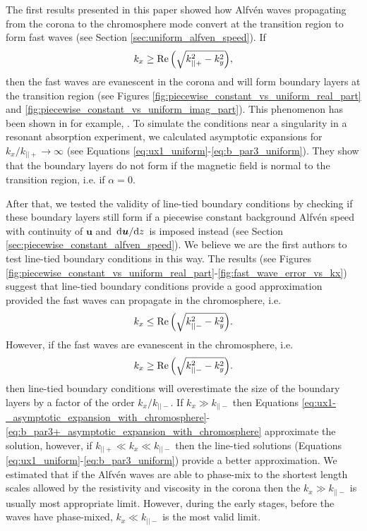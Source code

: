 \documentclass[linenumbers]{aastex63}
\let\vec\boldsymbol
\begin{document}
The first results presented in this paper showed how Alfv\'en waves propagating from the corona to the chromosphere mode convert at the transition region to form fast waves (see Section \ref{sec:uniform_alfven_speed}). If
\[k_x \ge \Re\qty(\sqrt{k_{||+}^2 - k_y^2}),\]
then the fast waves are evanescent in the corona and will form boundary layers at the transition region (see Figures \ref{fig:piecewise_constant_vs_uniform_real_part} and \ref{fig:piecewise_constant_vs_uniform_imag_part}). This phenomenon has been shown in for example, \citet{Halberstadt1993,Halberstadt1995,Arregui2003}. 
To simulate the conditions near a singularity in a resonant absorption experiment, we calculated asymptotic expansions for $k_x / k_{||+} \rightarrow \infty$ (see Equations \ref{eq:ux1_uniform}-\ref{eq:b_par3_uniform}). They show that the boundary layers do not form if the magnetic field is normal to the transition region, i.e. if $\alpha=0$.

After that, we tested the validity of line-tied boundary conditions by checking if these boundary layers still form if a piecewise constant background Alfv\'en speed with continuity of $\vec{u}$ and $\dv*{\vec{u}}{z}$ is imposed instead (see Section \ref{sec:piecewise_constant_alfven_speed}). We believe we are the first authors to test line-tied boundary conditions in this way. The results (see Figures \ref{fig:piecewise_constant_vs_uniform_real_part}-\ref{fig:fast_wave_error_vs_kx}) suggest that line-tied boundary conditions provide a good approximation provided the fast waves can propagate in the chromosphere, i.e.
\[k_x \le \Re\qty(\sqrt{k_{||-}^2 - k_y^2}).\]
However, if the fast waves are evanescent in the chromosphere, i.e. 
\[k_x \ge \Re\qty(\sqrt{k_{||-}^2 - k_y^2}).\]
then line-tied boundary conditions will overestimate the size of the boundary layers by a factor of the order $k_x / k_{||-}$. If $k_x\gg k_{||-}$ then Equations \eqref{eq:ux1-_asymptotic_expansion_with_chromosphere}-\eqref{eq:b_par3+_asymptotic_expansion_with_chromosphere} approximate the solution, however, if $k_{||+} \ll k_x\ll k_{||-}$ then the line-tied solutions (Equations \ref{eq:ux1_uniform}-\ref{eq:b_par3_uniform}) provide a better approximation. We estimated that if the Alfv\'en waves are able to phase-mix to the shortest length scales allowed by the resistivity and viscosity in the corona then the $k_x\gg k_{||-}$ is usually most appropriate limit. However, during the early stages, before the waves have phase-mixed, $k_x\ll k_{||-}$ is the most valid limit.
\end{document}
